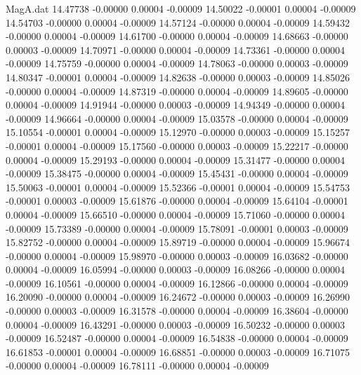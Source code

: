 \begin{filecontents}{MagA.dat}
  14.47738   -0.00000    0.00004   -0.00009
  14.50022   -0.00001    0.00004   -0.00009
  14.54703   -0.00000    0.00004   -0.00009
  14.57124   -0.00000    0.00004   -0.00009
  14.59432   -0.00000    0.00004   -0.00009
  14.61700   -0.00000    0.00004   -0.00009
  14.68663   -0.00000    0.00003   -0.00009
  14.70971   -0.00000    0.00004   -0.00009
  14.73361   -0.00000    0.00004   -0.00009
  14.75759   -0.00000    0.00004   -0.00009
  14.78063   -0.00000    0.00003   -0.00009
  14.80347   -0.00001    0.00004   -0.00009
  14.82638   -0.00000    0.00003   -0.00009
  14.85026   -0.00000    0.00004   -0.00009
  14.87319   -0.00000    0.00004   -0.00009
  14.89605   -0.00000    0.00004   -0.00009
  14.91944   -0.00000    0.00003   -0.00009
  14.94349   -0.00000    0.00004   -0.00009
  14.96664   -0.00000    0.00004   -0.00009
  15.03578   -0.00000    0.00004   -0.00009
  15.10554   -0.00001    0.00004   -0.00009
  15.12970   -0.00000    0.00003   -0.00009
  15.15257   -0.00001    0.00004   -0.00009
  15.17560   -0.00000    0.00003   -0.00009
  15.22217   -0.00000    0.00004   -0.00009
  15.29193   -0.00000    0.00004   -0.00009
  15.31477   -0.00000    0.00004   -0.00009
  15.38475   -0.00000    0.00004   -0.00009
  15.45431   -0.00000    0.00004   -0.00009
  15.50063   -0.00001    0.00004   -0.00009
  15.52366   -0.00001    0.00004   -0.00009
  15.54753   -0.00001    0.00003   -0.00009
  15.61876   -0.00000    0.00004   -0.00009
  15.64104   -0.00001    0.00004   -0.00009
  15.66510   -0.00000    0.00004   -0.00009
  15.71060   -0.00000    0.00004   -0.00009
  15.73389   -0.00000    0.00004   -0.00009
  15.78091   -0.00001    0.00003   -0.00009
  15.82752   -0.00000    0.00004   -0.00009
  15.89719   -0.00000    0.00004   -0.00009
  15.96674   -0.00000    0.00004   -0.00009
  15.98970   -0.00000    0.00003   -0.00009
  16.03682   -0.00000    0.00004   -0.00009
  16.05994   -0.00000    0.00003   -0.00009
  16.08266   -0.00000    0.00004   -0.00009
  16.10561   -0.00000    0.00004   -0.00009
  16.12866   -0.00000    0.00004   -0.00009
  16.20090   -0.00000    0.00004   -0.00009
  16.24672   -0.00000    0.00003   -0.00009
  16.26990   -0.00000    0.00003   -0.00009
  16.31578   -0.00000    0.00004   -0.00009
  16.38604   -0.00000    0.00004   -0.00009
  16.43291   -0.00000    0.00003   -0.00009
  16.50232   -0.00000    0.00003   -0.00009
  16.52487   -0.00000    0.00004   -0.00009
  16.54838   -0.00000    0.00004   -0.00009
  16.61853   -0.00001    0.00004   -0.00009
  16.68851   -0.00000    0.00003   -0.00009
  16.71075   -0.00000    0.00004   -0.00009
  16.78111   -0.00000    0.00004   -0.00009

\end{filecontents}
